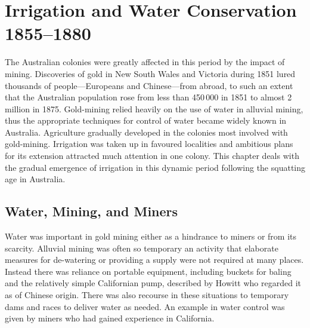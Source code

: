 
\setcounter{endnote}{0}

\chapter{Irrigation and Water Conservation 1855--1880}
\label{ch:emergence}

The Australian colonies were greatly affected in this period by the
impact of mining.  Discoveries of gold in New South Wales and Victoria
during 1851 lured thousands of people---Europeans and Chinese---from
abroad, to such an extent that the Australian population rose from
less than 450\,000 in 1851 to almost 2 million in 1875.  Gold-mining
relied heavily on the use of water in alluvial mining, thus the
appropriate techniques for control of water became widely known in
Australia.  Agriculture gradually developed in the colonies most
involved with gold-mining.  Irrigation was taken up in favoured
localities and ambitious plans for its extension attracted much
attention in one colony.  This chapter deals with the gradual
emergence of irrigation in this dynamic period following the squatting
age in Australia.

\section*{Water, Mining, and Miners}

Water was important in gold mining either as a hindrance to miners or
from its scarcity.  Alluvial mining was often so temporary an activity
that elaborate measures for de-watering or providing a supply were not
required at many places.  Instead there was reliance on portable
equipment, including buckets for baling and the relatively simple
Californian pump, described by Howitt who regarded it as of Chinese
origin.  There was also recourse in these situations to temporary dams
and races to deliver water as needed.  An example in water control was
given by miners who had gained experience in
California.

